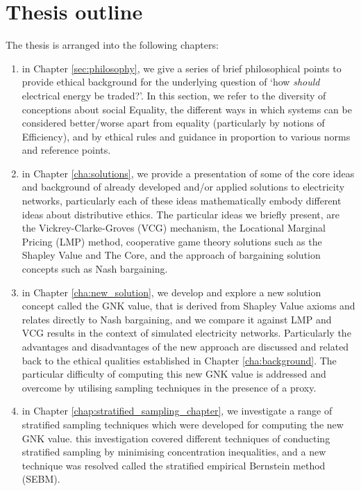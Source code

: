\section{Thesis outline}
The thesis is arranged into the following chapters:
\begin{enumerate}
\item in Chapter \ref{sec:philosophy}, we give a series of brief philosophical points to provide ethical background for the underlying question of `how \textit{should} electrical energy be traded?'. In this section, we refer to the diversity of conceptions about social Equality, the different ways in which systems can be considered better/worse apart from equality (particularly by notions of Efficiency), and by ethical rules and guidance in proportion to various norms and reference points. 
\item in Chapter \ref{cha:solutions}, we provide a presentation of some of the core ideas and background of already developed and/or applied solutions to electricity networks, particularly each of these ideas mathematically embody different ideas about distributive ethics. The particular ideas we briefly present, are the Vickrey-Clarke-Groves (VCG) mechanism, the Locational Marginal Pricing (LMP) method, cooperative game theory solutions such as the Shapley Value and The Core, and the approach of bargaining solution concepts such as Nash bargaining. 
\item in Chapter \ref{cha:new_solution}, we develop and explore a new solution concept called the GNK value, that is derived from Shapley Value axioms and relates directly to Nash bargaining, and we compare it against LMP and VCG results in the context of simulated electricity networks. Particularly the advantages and disadvantages of the new approach are discussed and related back to the ethical qualities established in Chapter \ref{cha:background}. The particular difficulty of computing this new GNK value is addressed and overcome by utilising sampling techniques in the presence of a proxy.
\item in Chapter \ref{chap:stratified_sampling_chapter}, we investigate a range of stratified sampling techniques which were developed for computing the new GNK value. this investigation covered different techniques of conducting stratified sampling by minimising concentration inequalities, and a new technique was resolved called the stratified empirical Bernstein method (SEBM).
\end{enumerate}




